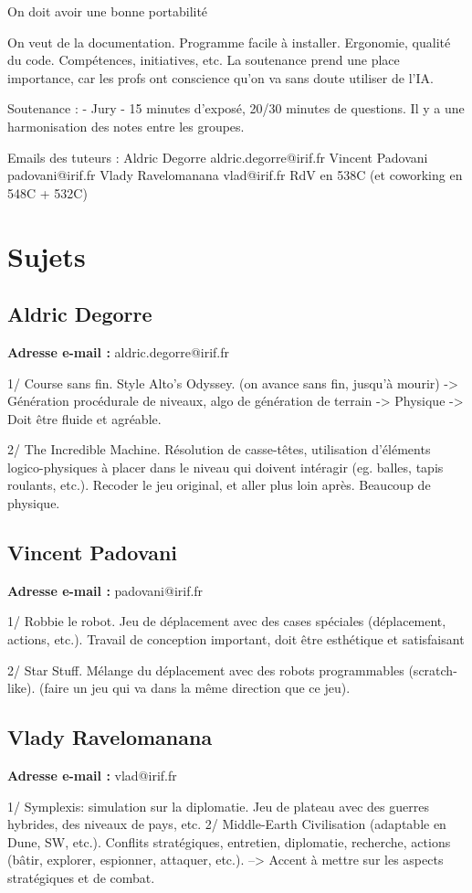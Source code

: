 \documentclass{article}
\begin{document}
On doit avoir une bonne portabilité

On veut de la documentation.
Programme facile à installer.
Ergonomie, qualité du code.
Compétences, initiatives, etc.
La soutenance prend une place importance, car les profs ont conscience qu'on va sans doute utiliser de l'IA.

Soutenance :
- Jury
- 15 minutes d'exposé, 20/30 minutes de questions.
Il y a une harmonisation des notes entre les groupes.

Emails des tuteurs :
Aldric Degorre aldric.degorre@irif.fr
Vincent Padovani padovani@irif.fr
Vlady Ravelomanana vlad@irif.fr
RdV en 538C (et coworking en 548C + 532C)

\section{Sujets}
\subsection{Aldric Degorre}
\textbf{Adresse e-mail :} aldric.degorre@irif.fr

1/ Course sans fin. Style Alto's Odyssey. (on avance sans fin, jusqu'à mourir)
-> Génération procédurale de niveaux, algo de génération de terrain
-> Physique
-> Doit être fluide et agréable.

2/ The Incredible Machine. Résolution de casse-têtes, utilisation d'éléments logico-physiques à placer dans le niveau qui doivent intéragir (eg. balles, tapis roulants, etc.).
Recoder le jeu original, et aller plus loin après. Beaucoup de physique.
\subsection{Vincent Padovani}
\textbf{Adresse e-mail :} padovani@irif.fr

1/ Robbie le robot. Jeu de déplacement avec des cases spéciales (déplacement, actions, etc.).
Travail de conception important, doit être esthétique et satisfaisant

2/ Star Stuff. Mélange du déplacement avec des robots programmables (scratch-like).
(faire un jeu qui va dans la même direction que ce jeu).

\subsection{Vlady Ravelomanana}
\textbf{Adresse e-mail :} vlad@irif.fr

1/ Symplexis: simulation sur la diplomatie. Jeu de plateau avec des guerres hybrides, des niveaux de pays, etc.
2/ Middle-Earth Civilisation (adaptable en Dune, SW, etc.). Conflits stratégiques, entretien, diplomatie, recherche, actions (bâtir, explorer, espionner, attaquer, etc.).
--> Accent à mettre sur les aspects stratégiques et de combat.
\end{document}
